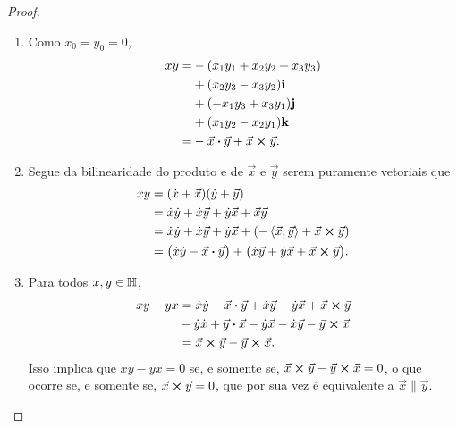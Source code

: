 \begin{proof}
\begin{enumerate}
	\item Como $x_0=y_0=0$,
	\begin{align*}
	xy =& -(x_1y_1 + x_2y_2 + x_3y_3) \\
			&+ (x_2y_3-x_3y_2)\bm{\mathrm{i}} \\
			&+ (-x_1y_3+x_3y_1)\bm{\mathrm{j}} \\
			&+ (x_1y_2-x_2y_1)\bm{\mathrm{k}} \\
		=& - {\vec{x}} \bm{\cdot} {\vec{y}} + {\vec{x}} \bm{\times} {\vec{y}}.
	\end{align*}

	\item Segue da bilinearidade do produto e de $\vec{x}$ e $\vec{y}$ serem puramente vetoriais que
	\begin{align*}
	xy &= (\dot{x}+\vec{x})(\dot{y}+\vec{y}) \\
		&= \dot{x}\dot{y}+\dot{x}\vec{y}+\dot{y}\vec{x}+\vec{x}\vec{y} \\
		&= \dot{x}\dot{y}+\dot{x}\vec{y}+\dot{y}\vec{x}+(-\left\langle{\vec{x}},{\vec{y}}\right\rangle + {\vec{x}} \bm{\times} {\vec{y}}) \\
		&= \big(\dot{x}\dot{y} - {\vec{x}} \bm{\cdot} {\vec{y}}\big) + \big(\dot{x}\vec{y}+\dot{y}\vec{x}+{\vec{x}} \bm{\times} {\vec{y}} \big).
	\end{align*}
	
	\item Para todos $x,y \in \mathbb{H}$,
		\begin{align*}
		xy - yx &= \dot{x}\dot{y} - {\vec{x}} \bm{\cdot} {\vec{y}}+\dot{x}\vec{y}+\dot{y}\vec{x}+{\vec{x}} \bm{\times} {\vec{y}} \\
			&- \dot{y}\dot{x} + {\vec{y}} \bm{\cdot} {\vec{x}}-\dot{y}\vec{x}-\dot{x}\vec{y}-{\vec{y}} \bm{\times} {\vec{x}} \\
			&={\vec{x}} \bm{\times} {\vec{y}} - {\vec{y}} \bm{\times} {\vec{x}}.
		\end{align*}
Isso implica que $xy-yx=0$ se, e somente se, ${\vec{x}} \bm{\times} {\vec{y}} - {\vec{y}} \bm{\times} {\vec{x}}=0$, o que ocorre se, e somente se, ${\vec{x}} \bm{\times} {\vec{y}}=0$, que por sua vez é equivalente a $\vec{x} \parallel \vec{y}$.


\end{enumerate}
\end{proof}
